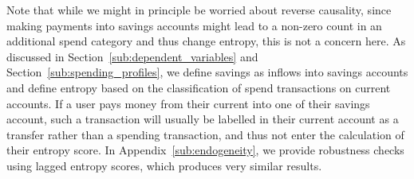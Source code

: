 Note that while we might in principle be worried about reverse causality, since
making payments into savings accounts might lead to a non-zero count in an
additional spend category and thus change entropy, this is not a concern here.
As discussed in Section~\ref{sub:dependent_variables} and
Section~\ref{sub:spending_profiles}, we define savings as inflows into savings
accounts and define entropy based on the classification of spend transactions
on current accounts. If a user pays money from their current into one of their
savings account, such a transaction will usually be labelled in their current
account as a transfer rather than a spending transaction, and thus not enter
the calculation of their entropy score. In Appendix~\ref{sub:endogeneity}, we
provide robustness checks using lagged entropy scores, which produces very
similar results.

